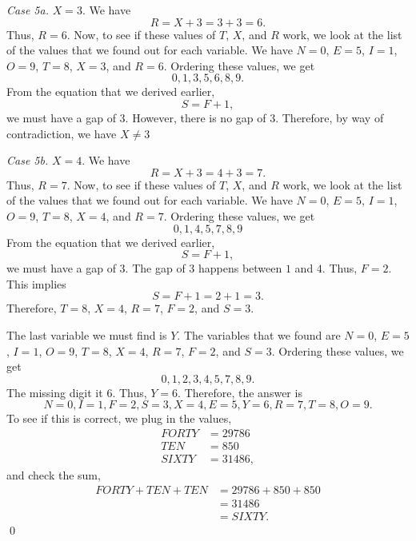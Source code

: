 \documentclass[12pt]{article}
\begin{document}
\noindent\textit{Case 5a.} $X=3$. We have
\[R=X+3=3+3=6.\]
Thus, $R=6$. Now, to see if these values of $T$, $X$, and $R$ work, we look at the list of the values that we found out for each variable. We have $N=0$, $E=5$, $I=1$, $O=9$, $T=8$, $X=3$, and $R=6$. Ordering these values, we get
\[0,1,3,5,6,8,9.\]
From the equation that we derived earlier,
\[S=F+1,\]
we must have a gap of $3$. However, there is no gap of $3$. Therefore, by way of contradiction, we have $X\neq 3$
\vspace{20px}

\noindent\textit{Case 5b.} $X=4$. We have
\[R=X+3=4+3=7.\]
Thus, $R=7$. Now, to see if these values of $T$, $X$, and $R$ work, we look at the list of the values that we found out for each variable. We have $N=0$, $E=5$, $I=1$, $O=9$, $T=8$, $X=4$, and $R=7$. Ordering these values, we get
\[0,1,4,5,7,8,9\]
From the equation that we derived earlier,
\[S=F+1,\]
we must have a gap of $3$. The gap of $3$ happens between $1$ and $4$. Thus, $F=2$. This implies
\[S=F+1=2+1=3.\]
Therefore, $\boxed{T=8}$, $\boxed{X=4}$, $\boxed{R=7}$, $\boxed{F=2}$, and $\boxed{S=3}$.
\newpage

\noindent The last variable we must find is $Y$. The variables that we found are $N=0$, $E=5$, $I=1$, $O=9$, $T=8$, $X=4$, $R=7$, $F=2$, and $S=3$. Ordering these values, we get
\[0,1,2,3,4,5,7,8,9.\]
The missing digit it $6$. Thus, $Y=6$. Therefore, the answer is \[\boxed{N=0},\boxed{I=1},\boxed{F=2},\boxed{S=3},\boxed{X=4},\boxed{E=5},\boxed{Y=6},\boxed{R=7},\boxed{T=8},\boxed{O=9}.\]
To see if this is correct, we plug in the values,
\begin{align*}
    FORTY&=29786\\
    TEN&=850\\
    SIXTY&=31486,
\end{align*}
and check the sum,
\begin{align*}
    FORTY+TEN+TEN&=29786+850+850\\
    &=31486\\
    &=SIXTY.
\end{align*}
\qed
\end{document}
